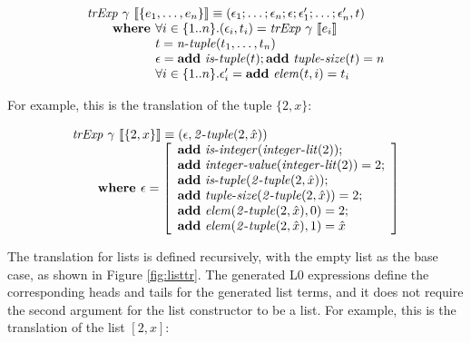 \[
\begin{array}{l}
\trExp{\gamma}{\{e_1, \ldots, e_n\}} \equiv (\epsilon_1; \dots; \epsilon_n;\epsilon;\epsilon'_1; \dots; \epsilon'_n, t)\\
\qquad \textbf{where } \forall i \in \{1..n\}. (\epsilon_i, t_i) = \trExp{\gamma}{e_i}\\
\qquad \phantom{\textbf{where }} t = \mathit{n\mbox{-}tuple}(t_1, \ldots, t_n)\\
\qquad \phantom{\textbf{where }} \epsilon = \addE~\istuple{t};\addE~\mathit{tuple\mbox{-}size}(t) = n\\
\qquad \phantom{\textbf{where }} \forall i \in \{1..n\}. \epsilon'_i = \addE~\mathit{elem}(t, i) = t_i\\
\end{array}
\]

For example, this is the translation of the tuple $\{2, x\}$:

\[
\begin{array}{l}
\mathit{trExp}~\gamma~\llbracket\{2, x\}\rrbracket \equiv (\epsilon, \mathit{2\mbox{-}tuple}(2,\hat{x}))\\
\qquad \textbf{where } \epsilon = \left[ 
\begin{array}{l}
\textbf{add}~\mathit{is\mbox{-}integer}(\mathit{integer\mbox{-}lit}(2));\\
\textbf{add}~\mathit{integer\mbox{-}value}(\mathit{integer\mbox{-}lit}(2)) = 2;\\
\textbf{add}~\mathit{is\mbox{-}tuple}(\mathit{2\mbox{-}tuple}(2,\hat{x}));\\
\textbf{add}~\mathit{tuple\mbox{-}size}(\mathit{2\mbox{-}tuple}(2,\hat{x})) = 2;\\
\textbf{add}~\mathit{elem}(\mathit{2\mbox{-}tuple}(2,\hat{x}), 0) = 2;\\
\textbf{add}~\mathit{elem}(\mathit{2\mbox{-}tuple}(2,\hat{x}), 1) = \hat{x}
\end{array}
\right]
\end{array}
\]

The translation for lists is defined recursively, with the empty list as the
base case, as shown in Figure \ref{fig:listtr}. The generated L0 expressions
define the corresponding heads and tails for the generated list terms, and it
does not require the second argument for the list constructor to be a list. For
example, this is the translation of the list $[2, x]$:

